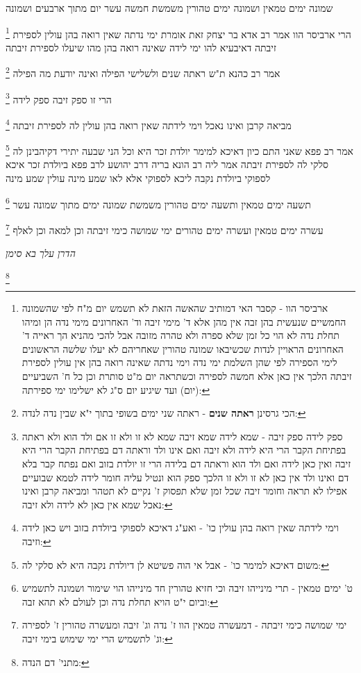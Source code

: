\documentclass[12pt, openany]{book}
\newcommand{\footnotecomment}[1]{
	\renewcommand\thefootnote{}
	\footnote{#1}}
\newcommand{\commenta}[1]{\footnotecomment{#1}}
\begin{document}
{{שמונה ימים טמאין ושמונה ימים טהורין משמשת חמשה עשר יום מתוך ארבעים ושמונה 
\commenta{ארביסר הוו - קסבר האי דמותיב שהאשה הזאת לא תשמש יום מ"ח לפי שהשמונה החמשיים שנעשית בהן זבה אין מהן אלא ד' מימי זיבה וד' האחרונים מימי נדה הן ומיהו תחלת נדה לא הוי כל זמן שלא ספרה ולא טהרה מזובה אבל להכי מהניא הך ראייה ד' האחרונים הראויין לנדות שכשיבאו שמונה טהורין שאחריהם לא יעלו שלשה הראשונים לימי הספירה לפי שהן השלמת ימי נדה וימי נדתה שאינה רואה בהן אין עולין לספירת זיבתה הלכך אין כאן אלא חמשה לספירה וכשתראה יום מ"ט סותרת וכן כל ח' השביעיים (יום) ועד שיגיע יום ס"ג לא ישלימו ימי ספירתה:}
הרי ארביסר הוו 
אמר רב אדא בר יצחק זאת אומרת ימי נדתה שאין רואה בהן עולין לספירת זיבתה דאיבעיא להו
ימי לידה שאינה רואה בהן מהו שיעלו לספירת זיבתה 
\commenta{הכי גרסינן \textbf{ראתה שנים} - ראתה שני ימים בשופי בתוך י"א שבין נדה לנדה:}
אמר רב כהנא ת"ש ראתה שנים ולשלישי הפילה ואינה יודעת מה הפילה
\commenta{ספק לידה ספק זיבה - שמא לידה שמא זיבה שמא לא זו ולא זו אם ולד הוא ולא ראתה בפתיחת הקבר הרי היא לידה ולא זיבה ואם אינו ולד וראתה דם בפתיחת הקבר הרי היא זיבה ואין כאן לידה ואם ולד הוא וראתה דם בלידה הרי זו יולדת בזוב ואם נפתח קבר בלא דם ואינו ולד אין כאן לא זו ולא זו הלכך ספק הוא ונטיל עליה חומר לידה לטמא שבועיים אפילו לא תראה וחומר זיבה שכל זמן שלא תפסוק ז' נקיים לא תטהר ומביאה קרבן ואינו נאכל שמא אין כאן לא לידה ולא זיבה:}
הרי זו ספק זיבה ספק לידה 
\commenta{וימי לידתה שאין רואה בהן עולין כו' - ואע"ג דאיכא לספוקי ביולדת בזוב ויש כאן לידה וזיבה:}
מביאה קרבן ואינו נאכל וימי לידתה שאין רואה בהן עולין לה לספירת זיבתה 
\commenta{משום דאיכא למימר כו' - אבל אי הוה פשיטא לן דיולדת נקבה היא לא סלקי לה:}
אמר רב פפא שאני התם כיון דאיכא למימר יולדת זכר היא וכל הני שבעה יתירי דקיהבינן לה סלקי לה לספירת זיבתה 
אמר ליה רב הונא בריה דרב יהושע לרב פפא ביולדת זכר איכא לספוקי ביולדת נקבה ליכא לספוקי אלא לאו שמע מינה עולין שמע מינה 
\commenta{ט' ימים טמאין - תרי מינייהו זיבה וכי חזיא טהורין חד מינייהו הוי שימור ושמונה לתשמיש וביום י"ט הויא תחלת נדה וכן לעולם לא תהא זבה:}
תשעה ימים טמאין ותשעה ימים טהורין משמשת שמונה ימים מתוך שמונה עשר 
\commenta{ימי שמושה כימי זיבתה - דמעשרה טמאין הוו ז' נדה וג' זיבה ומעשרה טהורין ז' לספירה וג' לתשמיש הרי ימי שימוש בימי זיבה:}
עשרה ימים טמאין ועשרה ימים טהורים ימי שמושה כימי זיבתה וכן למאה וכן לאלף
\par \par {\large\emph{הדרן עלך בא סימן}}\par \par 
\commenta{מתני' דם הנדה:}

}}
\end{document}
